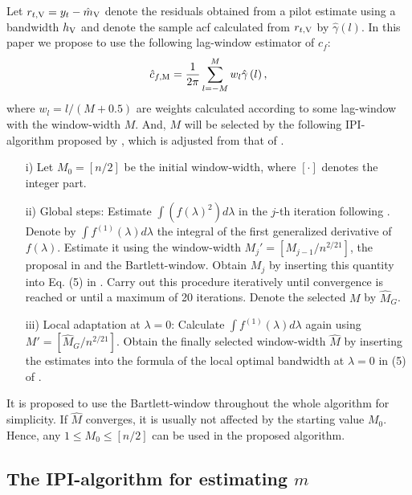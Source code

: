 Let $r_{t, {\rm V}}=y_t-\hat m_{\rm V}$ denote the residuals obtained from a pilot estimate using a bandwidth $h_{\rm V}$ and denote the sample acf calculated from $r_{t, {\rm V}}$ by $\hat \gamma\left(l\right)$. 
In this paper we propose to use the following lag-window estimator of $c_f$: 
\begin{equation}\label{eq:cfbw}
\hat c_{f, {\rm M}}=\frac{1}{2\pi}\sum_{l=-M}^{M} w_l \hat \gamma\left(l\right), 
\end{equation}
where $w_l=l/\left(M+0.5\right)$ are weights calculated according to some lag-window with the window-width  $M$. And, $M$ will be selected by the following IPI-algorithm proposed by \citet{fenggriesfritz2020}, which is adjusted from that of \citet{buhlmann1996locally}. 
\begin{enumerate}
	\item[\enspace\enspace i)]  Let $M_0=\left[n/2\right]$ be the initial window-width, where $\left[\cdot\right]$ denotes the integer part. 
	\item[\enspace ii)]  Global steps: Estimate $\int\left(f\left(\lambda\right)^2\right)d\lambda$ in the $j$-th iteration following \citet{buhlmann1996locally}. Denote by $\int f^{\left(1\right)}\left(\lambda\right) d\lambda$ the integral of the first generalized derivative of $f\left(\lambda\right)$. Estimate it using the window-width $M_j'=\left[M_{j-1}/n^{2/21}\right]$, the proposal in \citet{buhlmann1996locally} and the Bartlett-window. Obtain $M_j$ by inserting this quantity into Eq. (5) in \citet{buhlmann1996locally}. Carry out this procedure iteratively until convergence is reached or until a maximum of 20 iterations. Denote the selected $M$ by $\hat M_G$.
	\item[iii)] Local adaptation at $\lambda=0$:  Calculate $\int f^{\left(1\right)}\left(\lambda\right) d\lambda$ again using $M'=\left[\hat M_G/n^{2/21}\right]$. Obtain the finally selected window-width $\hat M$ by inserting the estimates into the formula of the local optimal bandwidth at $\lambda=0$ in (5) of \citet{buhlmann1996locally}.   
\end{enumerate}
It is proposed to use the Bartlett-window throughout the whole algorithm for simplicity. If $\hat M$ converges, it is usually not affected by the starting value $M_0$. Hence, any $1\le M_0\le\left[n/2\right]$ can be used in the proposed algorithm.  

\subsection{The IPI-algorithm for estimating $m$} \label{sec:trendEst}

